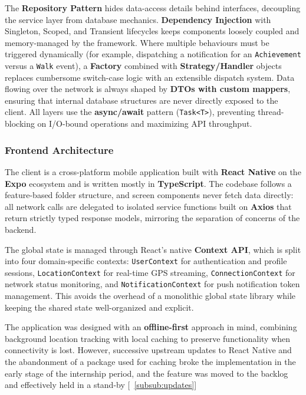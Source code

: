 \documentclass[11pt,a4paper]{article}
\begin{document}
The \textbf{Repository Pattern} hides data-access details behind interfaces, decoupling the service layer from database mechanics.
\textbf{Dependency Injection} with Singleton, Scoped, and Transient lifecycles keeps components loosely coupled and memory-managed by the framework.
Where multiple behaviours must be triggered dynamically (for example, dispatching a notification for an \texttt{Achievement} versus a \texttt{Walk} event), a \textbf{Factory} combined with \textbf{Strategy/Handler} objects replaces cumbersome switch-case logic with an extensible dispatch system.
Data flowing over the network is always shaped by \textbf{DTOs with custom mappers}, ensuring that internal database structures are never directly exposed to the client.
All layers use the \textbf{async/await} pattern (\texttt{Task<T>}), preventing thread-blocking on I/O-bound operations and maximizing API throughput.





\newpage

\subsubsection{Frontend Architecture}
\label{subsub:tech:frontend}

The client is a cross-platform mobile application built with \textbf{React Native} on the \textbf{Expo} ecosystem and is written mostly in \textbf{TypeScript}.
The codebase follows a feature-based folder structure, and screen components never fetch data directly: all network calls are delegated to isolated service functions built on \textbf{Axios} that return strictly typed response models, mirroring the separation of concerns of the backend.

The global state is managed through React's native \textbf{Context API}, which is split into four domain-specific contexts: \texttt{UserContext} for authentication and profile sessions, \texttt{LocationContext} for real-time GPS streaming, \texttt{ConnectionContext} for network status monitoring, and \texttt{NotificationContext} for push notification token management.
This avoids the overhead of a monolithic global state library while keeping the shared state well-organized and explicit.

The application was designed with an \textbf{offline-first} approach in mind, combining background location tracking with local caching to preserve functionality when connectivity is lost.
However, successive upstream updates to React Native and the abandonment of a package used for caching broke the implementation in the early stage of the internship period, and the feature was moved to the backlog and effectively held in a stand-by [~\ref{subsub:updates}]
\end{document}
